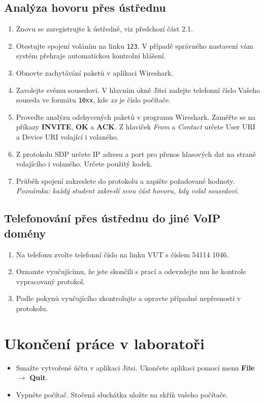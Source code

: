 \subsection{Analýza hovoru přes ústřednu}
\begin{enumerate}
  \item Znovu se zaregistrujte k ústředně, viz předchozí část 2.1.
  \item Otestujte spojení voláním na linku {\tt 123}. V případě správného nastavení vám systém přehraje automatickou kontrolní hlášení. 
    \item Obnovte zachytávání paketů v aplikaci Wireshark.
    \item Zavolejte svému sousedovi. V hlavním okně Jitsi zadejte telefonní číslo Vašeho souseda ve formátu {\tt 10xx}, kde {\it xx} je číslo počítače.
    \item Proveďte analýzu odchycených paketů v programu Wireshark. Zaměřte se na příkazy {\bf INVITE}, {\bf OK} a {\bf ACK}. Z hlaviček {\it From} a {\it Contact} určete User URI a Device URI volající i volaného.
    \item Z protokolu SDP určete IP adresu a port pro přenos hlasových dat na straně volajícího i volaného. Určete použitý kodek. 
    \item Průběh spojení zakreslete do protokolu a zapište požadované hodnoty. {\it Poznámka: každý student zakreslí svou část hovoru, kdy volal sousedovi.}
\end{enumerate}

\subsection{Telefonování přes ústřednu do jiné VoIP domény}
\begin{enumerate}
    \item Na telefonu zvolte telefonní číslo na linku VUT s číslem 54114 1046.
    \item Oznamte vyučujícímu, že jste skončili s prací a odevzdejte mu ke kontrole vypracovaný protokol. 
    \item Podle pokynů vyučujícího zkontrolujte a opravte případné nepřesnosti v protokolu. 
\end{enumerate}

\section{Ukončení práce v laboratoři}
\begin{itemize}
  \item Smažte vytvořené účtu v aplikaci Jitsi. Ukončete aplikaci pomocí menu {\bf File} $\rightarrow$ {\bf Quit}.
  \item Vypněte počítač. Stočená sluchátka uložte na skříň vašeho počítače.
\end{itemize}
